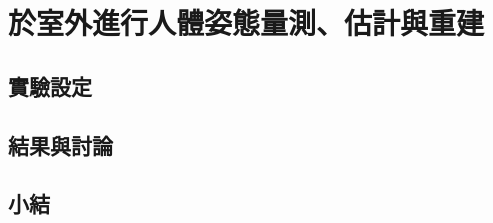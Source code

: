 \chapter{於室外進行人體姿態量測、估計與重建}
\fontsize{12pt}{18pt}\selectfont

\section{實驗設定}
\section{結果與討論}
\section{小結}

\clearpage